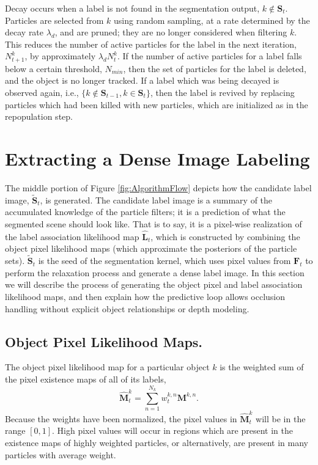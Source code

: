 Decay occurs when a label is not found in the segmentation output, $ k \notin \mathbf{S}_t $. Particles are selected from $k$ using random sampling, at a rate determined by the decay rate $\lambda_d$, and are pruned; they are no longer considered when filtering $k$. This reduces the number of active particles for the label in the next iteration, $N^k_{t+1}$, by approximately $\lambda_d N^k_t$. If the number of active particles for a label falls below a certain threshold, $N_{min}$, then the set of particles for the label is deleted, and the object is no longer tracked. If a label which was being decayed is observed again, i.e., $ \{ k\notin \mathbf{S}_{t-1}, k\in \mathbf{S}_{t}\}$, then the label is revived by replacing particles which had been killed with new particles, which are initialized as in the repopulation step.

\section{Extracting a Dense Image Labeling}
\label{sec:Label Image Generation}

The middle portion of Figure \ref{fig:AlgorithmFlow} depicts how the candidate label image,  $\tilde{\mathbf{S}}_{t}$, is generated. The candidate label image is a summary of the accumulated knowledge of the particle filters; it is a prediction of what the segmented scene should look like. That is to say, it is a pixel-wise realization of the label association likelihood map $\hat{\mathbf{L}}_{t}$, which is constructed by combining the object pixel likelihood maps (which approximate the posteriors of the particle sets). $\tilde{\mathbf{S}}_{t}$ is the seed of the segmentation kernel, which uses pixel values from $\mathbf{F}_t$  to perform the relaxation process and generate a dense label image. In this section we will describe the process of generating the object pixel and label association likelihood maps, and then explain how the predictive loop allows occlusion handling without explicit object relationships or depth modeling.

\subsection{Object Pixel Likelihood Maps.}
The object pixel likelihood map for a particular object $k$ is the weighted sum of the pixel existence maps of all of its labels,
\begin{equation}
\label{eqn:PixelLikelihood}
\hat{\mathbf{M}}^{k}_{t} = \sum_{n=1}^{N_k}w^{k,n}_t \mathbf{M}^{k,n} .
\end{equation}
Because the weights have been normalized, the pixel values in $\hat{\mathbf{M}}^{k}_{t}$ will be in the range $[0,1]$. High pixel values will occur in regions which are present in the existence maps of highly weighted particles, or alternatively, are present in many particles with average weight. 

